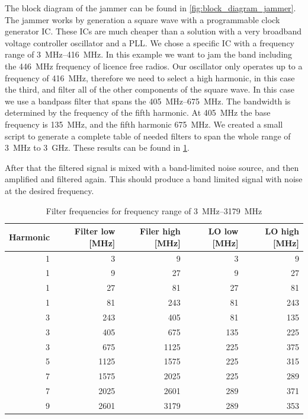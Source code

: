 \documentclass[a4paper, openany, oneside]{memoir}
\begin{document}
The block diagram of the jammer can be found in \cref{fig:block_diagram_jammer}. The jammer works by generation a square wave with a programmable clock generator IC\@. These ICs are much cheaper than a solution with a very broadband voltage controller oscillator and a PLL\@. We chose a specific IC with a frequency range of \SIrange{3}{416}{\mega\hertz}. In this example we want to jam the band including the \SI{446}{\mega\hertz} frequency of licence free radios. Our oscillator only operates up to a frequency of \SI{416}{\mega\hertz}, therefore we need to select a high harmonic, in this case the third, and filter all of the other components of the square wave. In this case we use a bandpass filter that spans the \SIrange{405}{675}{\mega\hertz}. The bandwidth is determined by the frequency of the fifth harmonic. At \SI{405}{\mega\hertz} the base frequency is \SI{135}{\mega\hertz}, and the fifth harmonic \SI{675}{\mega\hertz}. We created a small script to generate a complete table of needed filters to span the whole range of \SI{3}{\mega\hertz} to \SI{3}{\giga\hertz}. These results can be found in \cref{tab:filter_freqs}.

After that the filtered signal is mixed with a band-limited noise source, and then amplified and filtered again. This should produce a band limited signal with noise at the desired frequency.

\begin{table}[h]
\centering
\caption{Filter frequencies for frequency range of \SIrange{3}{3179}{\mega\hertz}}
\label{tab:filter_freqs}
\begin{tabular}{rrrrr}
\toprule
   Harmonic &   Filter low [\si{\mega\hertz}] &   Filer high [\si{\mega\hertz}] &   LO low [\si{\mega\hertz}] &   LO high [\si{\mega\hertz}] \\
\midrule
          1 &            3 &            9 &        3 &         9 \\
          1 &            9 &           27 &        9 &        27 \\
          1 &           27 &           81 &       27 &        81 \\
          1 &           81 &          243 &       81 &       243 \\
          3 &          243 &          405 &       81 &       135 \\
          3 &          405 &          675 &      135 &       225 \\
          3 &          675 &         1125 &      225 &       375 \\
          5 &         1125 &         1575 &      225 &       315 \\
          7 &         1575 &         2025 &      225 &       289 \\
          7 &         2025 &         2601 &      289 &       371 \\
          9 &         2601 &         3179 &      289 &       353 \\
\bottomrule
\end{tabular}
\end{table}
\end{document}

